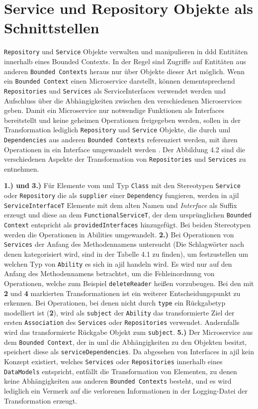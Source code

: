 \documentclass[
	oneside,  %
	ngerman, 
	final, 
	11pt, 
	a4paper, 
	1.1headlines, 
	headinclude=false, 
	footinclude=false, 
	mpinclude=false, 
	pagesize, 
	onecolumn, 
	titlepage, 
	parskip=half, 
	headsepline, 
	chapterprefix=false, 
	version=first, 
	listof=totoc, 
	bibliography=totoc, 
	toc=graduated, 
	fleqn
]{scrbook}
\begin{document}
\section{Service und Repository Objekte als Schnittstellen}
\texttt{Repository} und \texttt{Service} Objekte verwalten und manipulieren in \ac{ddd} Entitäten innerhalb eines Bounded Contexts. In der Regel sind Zugriffe auf Entitäten aus anderen \texttt{Bounded Contexts} heraus nur über Objekte dieser Art möglich. \cite{DDDEvans} Wenn ein \texttt{Bounded Context} einen Microservice darstellt, können dementsprechend \texttt{Repositories} und \texttt{Services} als ServiceInterfaces verwendet werden und Aufschluss über die Abhängigkeiten zwischen den verschiedenen Microservices geben. Damit ein Microservice nur notwendige Funktionen als Interfaces bereitstellt und keine geheimen Operationen freigegeben werden, sollen in der Transformation lediglich \texttt{Repository} und \texttt{Service} Objekte, die durch \ac{uml} \texttt{Dependencies} aus anderen \texttt{Bounded Contexts} referenziert werden, mit ihren Operationen in ein Interface umgewandelt werden \cite{Rademacher2017}. Der Abbildung 4.2 sind die verschiedenen Aspekte der Transformation von \texttt{Repositories} und \texttt{Services} zu entnehmen. 

\textbf{1.) und 3.)} Für Elemente vom \ac{uml} Typ \texttt{Class} mit den Stereotypen \texttt{Service} oder \texttt{Repository} die als \texttt{supplier} einer \texttt{Dependency} fungieren, werden in \ac{ajil} \texttt{ServiceInterfaceT} Elemente mit dem alten Namen und \textit{Interface} als Suffix erzeugt und diese an dem \texttt{FunctionalServiceT}, der dem ursprünglichen \texttt{Bounded Context} entspricht als \texttt{providedInterfaces} hinzugefügt. Bei beiden Stereotypen werden die Operationen in Abilities umgewandelt. \textbf{2.)} Bei Operationen von \texttt{Services} der Anfang des Methodennamens untersucht (Die Schlagwörter nach denen kategorisiert wird, sind in der Tabelle 4.1 zu finden), um festzustellen um welchen Typ von \texttt{Ability} es sich in \ac{ajil} handeln wird. Es wird nur auf den Anfang des Methodennamens betrachtet, um die Fehleinordnung von Operationen, welche zum Beispiel \texttt{deleteReader} heißen vorzubeugen. Bei den mit \textbf{2} und \textbf{4} markierten Transformationen ist ein weiterer Entscheidungspunkt zu erkennen. Bei Operationen, bei denen nicht durch \texttt{type} ein Rückgabetyp modelliert ist (\textbf{2}), wird als \texttt{subject} der \texttt{Ability} das transformierte Ziel der ersten \texttt{Association} des \texttt{Services} oder \texttt{Repositories} verwendet. Andernfalls wird das transformierte Rückgabe Objekt zum \texttt{subject}. \textbf{5.)} Der Microservice aus dem \texttt{Bounded Context}, der in \ac{uml} die Abhängigkeiten zu den Objekten besitzt, speichert diese als \texttt{serviceDependencies}. Da abgesehen von Interfaces in \ac{ajil} kein Konzept existiert, welches \texttt{Services} oder \texttt{Repositories} innerhalb eines \texttt{DataModels} entspricht, entfällt die Transformation von Elementen, zu denen keine Abhängigkeiten aus anderen \texttt{Bounded Contexts} besteht, und es wird lediglich ein Vermerk auf die verlorenen Informationen in der Logging-Datei der Transformation erzeugt.
\end{document}
